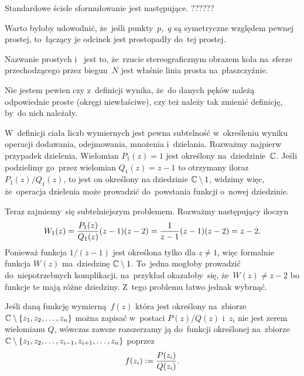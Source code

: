 \documentclass[a4paper,11pt]{article}
\begin{document}
Standardowe ścisłe sformułowanie jest następujące. ??????

\vspace{\spaceFour}


\start {} Warto byłoby udowodnić, że~jeśli punkty~$p$,~$q$ są
symetryczne względem pewnej prostej, to~łączący je odcinek jest
prostopadły do~tej prostej.

\vspace{\spaceFour}


\start {} Nazwanie prostych 
i~ jest to,
że~rzucie stereograficznym obrazem koła na~sferze przechodzącego przez
biegun~$N$ jest właśnie linia prosta na~płaszczyźnie.

\vspace{\spaceFour}


\start {} Nie jestem pewien czy z~definicji wynika, że~do danych
pęków należą odpowiednie proste (okręgi niewłaściwe), czy też należy
tak zmienić definicję, by~do nich należały.

\vspace{\spaceFour}


\start {} W~definicji ciała liczb wymiernych jest pewna
subtelność w~określeniu wyniku operacji dodawania, odejmowania,
mnożenia i~dzielania. Rozważmy najpierw przypadek dzielenia. Wielomian
$P_{ 1 }( z ) = 1$ jest określony na~dziedzinie~$\mathbb{C}$. Jeśli podzielimy
go~przez wielomian $Q_{ 1 }( z ) = z - 1$ to otrzymany iloraz
$P_{ 1 }( z ) / Q_{ 1 }( z )$, to jest on określony na dziedzinie
$\mathbb{C} \setminus 1$, widzimy więc, że~operacja dzielenia może prowadzić
do~powstania funkcji o~nowej dziedzinie.

Teraz zajmiemy~się subtelniejszym problemem. Rozważmy następujący
iloczyn
\begin{equation}
  \label{eq:Leja-??}
  \begin{split}
    W_{ 1 }( z ) = \frac{ P_{ 1 }( z ) }{ Q_{ 1 }( z ) } ( z - 1 ) ( z -
    2 ) = \frac{ 1 }{ z - 1 } ( z - 1 ) ( z - 2 ) = z - 2.
  \end{split}
\end{equation}
Ponieważ funkcja $1 / ( z - 1 )$ jest określona tylko dla $z \neq 1$,
więc formalnie funkcja $W( z )$ ma~dziedzinę $\mathbb{C} \setminus 1$.
To~jedna mogłoby prowadzić do~niepotrzebnych komplikacji, na~przykład
okazałoby~się, że~$W( z ) \neq z - 2$ bo funkcje te mają różne
dziedziny. Z~tego problemu łatwo jednak wybrnąć.

Jeśli daną funkcję wymierną~$f( z )$ która jest określony na~zbiorze
$\mathbb{C} \setminus \{  z_{ 1 }, z_{ 2 }, \ldots, z_{ n }  \}$ można zapisać
w~postaci $P( z ) / Q( z )$ i~$z_{ i }$ nie jest zerem wielomianu $Q$,
wówczas zawsze rozszerzamy ją do~funkcji określonej na~zbiorze
$\mathbb{C} \setminus \{  z_{ 1 }, z_{ 2 }, \ldots, z_{ i - 1 }, z_{ i + 1 },
  \ldots, z_{ n }  \}$ poprzez
\begin{equation}
  \label{eq:Leja-???}
  \begin{split}
    f( z_{ i } ) := \frac{ P( z_{ i } ) }{ Q( z_{ i } ) }.
  \end{split}
\end{equation}
\end{document}
